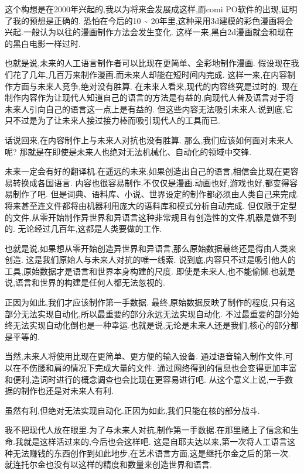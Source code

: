 这个构想是在2000年兴起的,我以为将来会发展成这样,而comi PO软件的出现,证明了我的预想是正确的.
恐怕在今后的10 \~{} 20年里,这种采用3d建模的彩色漫画将会兴起.一般认为以往的漫画制作方法会发生变化.
这样一来,黑白2d漫画就会和现在的黑白电影一样过时.

也就是说,未来的人工语言制作者可以比现在更简单、全彩地制作漫画.
假设现在我们花了几年,几百万来制作漫画.而未来人却能在短时间内完成.
这样一来,在内容制作方面与未来人竞争,绝对没有胜算.
在未来人看来,现代的内容终究是过时的.
现在制作内容作为让现代人知道自己的语言的方法是有益的,向现代人普及语言对于将未来人引向自己的语言这一点上是有益的.
但这些内容无法吸引未来人.说到底,它只不过是为了让未来人接过接力棒而吸引现代人的工具而已.

话说回来,在内容制作上与未来人对抗也没有胜算.
那么,我们应该如何面对未来人呢?
那就是在即使是未来人也绝对无法机械化、自动化的领域中交锋.

未来一定会有好的翻译机.在遥远的未来,如果创造出自己的语言,相信会比现在更容易转换成各国语言.
内容也很容易制作.不仅仅是漫画.动画也好,游戏也好,都变得容易制作了吧.
但是词典、语料库、小说、世界设定的制作都必须由人类自己来完成.
将来甚至连文件都将由机器利用庞大的语料库和模式分析自动完成.
但仅限于定型的文件.从零开始制作异世界和异语言这种非常规且有创造性的文件,机器是做不到的.
无论经过几百年,这都是人类要做的工作.

也就是说,如果想从零开始创造异世界和异语言,那么原始数据最终还是得由人类来创造.
这是我们原始人与未来人对抗的唯一线索.
说到底,内容只不过是吸引他人的工具,原始数据才是语言和世界本身构建的尺度.
即使是未来人,也不能偷懒.也就是说,语言和世界的构建是任何人都无法忽视的.

正因为如此,我们才应该制作第一手数据.
最终,原始数据反映了制作的程度,只有这部分无法实现自动化,所以最重要的部分永远无法实现自动化.
不过最重要的部分始终无法实现自动化倒也是一种幸运.也就是说,无论是未来人还是我们,核心的部分都是平等的.

当然,未来人将使用比现在更简单、更方便的输入设备.
通过语音输入制作文件,可以在不伤腰和肩的情况下完成大量的文件.
通过网络得到的信息也会变得更加丰富和便利,造词时进行的概念调查也会比现在更容易进行吧.
从这个意义上说,一手数据的制作也还是对未来人有利.

虽然有利,但绝对无法实现自动化.正因为如此,我们只能在核的部分战斗.

我不把现代人放在眼里.为了与未来人对抗,制作第一手数据.在那里赌上了信念和生命.我就是这样活过来的,今后也会这样吧.
这是自耶夫达以来,第一次将人工语言这种无法赚钱的东西创作到如此地步,在艺术语言方面,这是继托尔金之后的第一次.
就连托尔金也没有以这样的精度和数量来创造世界和语言.

